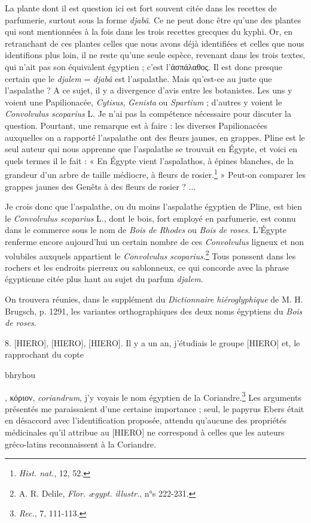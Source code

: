 \documentclass[a4paper, 11pt, oneside, landscape]{article}
\begin{document}
La plante dont il est question ici est fort souvent citée dans les recettes de parfumerie, surtout sous la forme \emph{djabâ}. Ce ne peut donc être qu'une des plantes qui sont mentionnées à la fois dans les trois recettes grecques du kyphi. Or, en retranchant de ces plantes celles que nous avons déjà identifiées et celles que nous identifions plus loin, il ne reste qu'une seule espèce, revenant dans les trois textes, qui n'ait pas son équivalent égyptien ; c'est l'ἀσπάλαθος. Il est donc presque certain que le \emph{djalem} = \emph{djabâ} est l'aspalathe. Mais qu'est-ce au juste que l'aspalathe ? A ce sujet, il y a divergence d'avis entre les botanistes. Les uns y voient une Papilionacée, \emph{Cytisus}, \emph{Genista} ou \emph{Spartium} ; d'autres y voient le \emph{Convolvulus scoparius} L. Je n'ai pas la compétence nécessaire pour discuter la question. Pourtant, une remarque est à faire : les diverses Papilionacées auxquelles on a rapporté l'aspalathe ont des fleurs jaunes, en grappes. Pline est le seul auteur qui nous apprenne que l'aspalathe se trouvait en Égypte, et voici en quels termes il le fait : « En Égypte vient l'aspalathos, à épines blanches, de la grandeur d'un arbre de taille médiocre, à fleurs de rosier.\footnote{\emph{Hist. nat.}, 12, 52.} » Peut-on comparer les grappes jaunes des Genêts à des fleurs de rosier ? ...

Je crois donc que l'aspalathe, ou du moins l'aspalathe égyptien de Pline, est bien le \emph{Convolvulus scoparius} L., dont le bois, fort employé en parfumerie, est connu dans le commerce sous le nom de \emph{Bois de Rhodes} ou \emph{Bois de roses}. L'Égypte renferme encore aujourd'hui un certain nombre de ces \emph{Convolvulus} ligneux et non volubiles auxquels appartient le \emph{Convolvulus scoparius}.\footnote{A. R. Delile, \emph{Flor. ægypt. illustr.}, n°s 222-231.} Tous poussent dans les rochers et les endroits pierreux ou sablonneux, ce qui concorde avec la phrase égyptienne citée plus haut au sujet du parfum \emph{djalem}.

On trouvera réunies, dans le supplément du \emph{Dictionnaire hiéroglyphique} de M. H. Brugsch, p. 1291, les variantes orthographiques des deux noms égyptiens du \emph{Bois de roses}.

8. [HIERO], [HIERO], [HIERO]. Il y a un an, j'étudiais le groupe [HIERO] et, le rapprochant du copte \begin{coptic}bhryhou\end{coptic}, κόριον, \emph{coriandrum}, j'y voyais le nom égyptien de la Coriandre.\footnote{\emph{Rec.}, 7, 111-113.} Les arguments présentés me paraissaient d'une certaine importance ; seul, le papyrus Ebers était en désaccord avec l'identification proposée, attendu qu'aucune des propriétés médicinales qu'il attribue au [HIERO] ne correspond à celles que les auteurs gréco-latins reconnaissent à la Coriandre.
\end{document}
